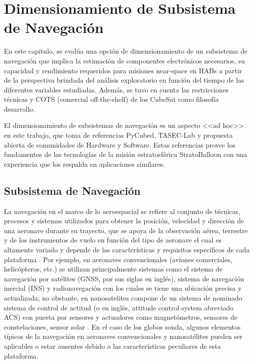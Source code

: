 \chapter{Dimensionamiento de Subsistema de Navegación} \label{chp:dimensionamiento}

\vspace{0.2cm}


En este capítulo, se evalúa una opción de dimensionamiento de un subsistema de navegación que implica la estimación de componentes electrónicos necesarios, su capacidad y rendimiento requeridos para misiones near-space en HABs a partir de la perspectiva brindada del análisis exploratorio en función del tiempo de las diferentes variables estudiadas. Además, se tuvo en cuenta las restricciones técnicas y  COTS (comercial off-the-shelf) de los CubeSat  como filosofía desarrollo.

\vspace{0.7cm}

El dimensionamiento de subsistemas de navegación es un aspecto   <<ad hoc>> en este trabajo, que toma de referencias PyCubed, TASEC-Lab y propuesta abierta de comunidades de Hardware y Software.  Estas referencias provee los fundamentos de  las tecnologías de la misión estratosférica StratoBalloon con una experiencia que los respalda en aplicaciones similares.

\newpage


\section{Subsistema de Navegación}

La navegación en el marco de lo aeroespacial se refiere al conjunto de técnicas, procesos y sistemas utilizados para obtener la posición, velocidad y dirección de una aeronave durante su trayecto,  que se apoya de la observación aérea, terrestre y de los instrumentos de vuelo en función del tipo de aeronave el cual es altamente variado y depende de las características y requisitos específicos de cada plataforma \cite{understanding_gps, gnss}. Por ejemplo, en aeronaves convencionales (aviones comerciales, helicópteros, etc.)  se utilizan principalmente  sistemas como el sistema de navegación por satélites (GNSS, por sus siglas en inglés), sistema de navegación inercial (INS)  y radionavegación con los cuales se tiene una ubicación precisa y actualizada; no obstante, en nanosatelites compone de un sistema de nominado sistema de control de actitud (o en inglés, attitude control system abreviado ACS) con puesta por sensores y actuadores como magnetómetros, sensores de constelaciones, sensor solar \cite{attitude_componentes_nanosatelites}.  En el caso de los globos sonda, algunos elementos típicos de la navegación en aeronaves convencionales y nanosatélites pueden ser aplicables o estar ausentes debido a las características peculiares de esta plataforma.

